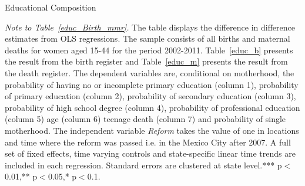 \documentclass[a4paper, 11pt]{article}
\begin{document}
\begin{spacing}{1.4}
\begin{table}
\begin{threeparttable}
\begin{tablenotes}
    \end{tablenotes} 
  \end{threeparttable}
\end{table} 
\begin{table}[H]   \caption{Educational Composition} \label{educ_Birth_mmr}
  \begin{threeparttable}
    \begin{subtable}{\columnwidth} \centering {}\label{educ_b}
      {\small 	}
    \end{subtable}
    
    \begin{subtable}{\columnwidth} \centering {}\label{educ_m}
      {\small 	}
    \end{subtable}
    
    \begin{tablenotes} 
      \footnotesize	\item \textit{Note to Table~\ref{educ_Birth_mmr}.} The table displays the difference in difference estimates from OLS regressions. The sample consists of all births and maternal deaths for women aged 15-44 for the period 2002-2011. Table~\ref{educ_b} presents the result from the birth register and Table~\ref{educ_m} presents the result from the death register. The dependent variables are, conditional on motherhood, the probability of having no or incomplete primary education (column 1), probability of primary education (column 2), probability of secondary education (column 3), probability of high school degree (column 4), probability of professional education (column 5) age (column 6) teenage death (column 7) and probability of single motherhood. The independent variable \textit{Reform} takes the value of one in locations and time where the reform was passed i.e. in the Mexico City after 2007. A full set of fixed effects, time varying controls and state-specific linear time trends are included in each regression. Standard errors are clustered at state level.*** p$<$0.01,** p$<$0.05,* p$<$0.1.  
    \end{tablenotes}
  \end{threeparttable}
\end{table}



\end{spacing}
\end{document}

